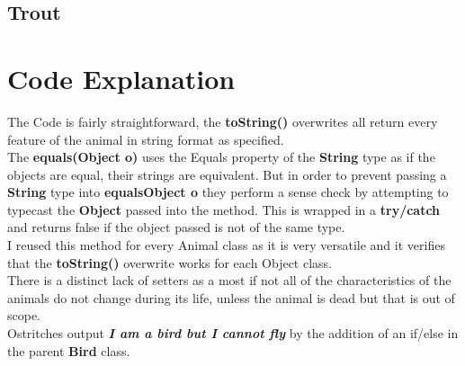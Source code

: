 \documentclass{article}
\begin{document}
	\subsection{Trout}
	\section{Code Explanation}
	The Code is fairly straightforward, the \textbf{toString()} overwrites all return every feature of the animal in string format as specified.\\
	The \textbf{equals(Object o)} uses the Equals property of the \textbf{String} type as if the objects are equal, their strings are equivalent. But in order to prevent passing a \textbf{String} type into \textbf{equals{Object o}} they perform a sense check by attempting to typecast the \textbf{Object} passed into the method. This is wrapped in a \textbf{try/catch} and returns false if the object passed is not of the same type. \\
	I reused this method for every Animal class as it is very versatile and it verifies that the \textbf{toString()} overwrite works for each Object class.\\
	There is a distinct lack of setters as a most if not all of the characteristics of the animals do not change during its life, unless the animal is dead but that is out of scope. \\
	Ostritches output \textbf{\textit{I am a bird but I cannot fly}} by the addition of an if/else in the parent \textbf{Bird} class.
	
	
\end{document}
